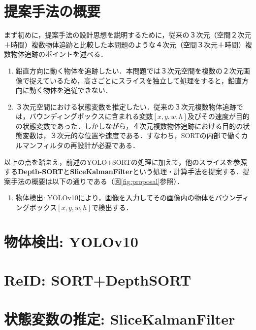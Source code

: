 \section{提案手法の概要}
まず初めに，提案手法の設計思想を説明するために，従来の３次元（空間２次元＋時間）複数物体追跡と比較した本問題のような４次元（空間３次元＋時間）複数物体追跡のポイントを述べる．
\begin{enumerate}
    \item 鉛直方向に動く物体を追跡したい．本問題では３次元空間を複数の２次元画像で捉えているため，高さごとにスライスを独立して処理をすると，鉛直方向に動く物体を追従できない．
    \item ３次元空間における状態変数を推定したい．従来の３次元複数物体追跡では，バウンディングボックスに含まれる変数$[x,y,w,h]$及びその速度が目的の状態変数であった．しかしながら，４次元複数物体追跡における目的の状態変数は，３次元的な位置や速度である．すなわち，SORTの内部で働くカルマンフィルタの再設計が必要である．
\end{enumerate}

以上の点を踏まえ，前述のYOLO+SORTの処理に加えて，他のスライスを参照する\textbf{Depth-SORT}と\textbf{SliceKalmanFilter}という処理・計算手法を提案する．提案手法の概要は以下の通りである（図\ref{fig:proposal}参照）．

\begin{enumerate}
    \item 物体検出: YOLOv10により，画像を入力してその画像内の物体をバウンディングボックス$[x,y,w,h]$で検出する．
\end{enumerate}

\section{物体検出: YOLOv10}

\section{ReID: SORT+DepthSORT}

\section{状態変数の推定: SliceKalmanFilter}